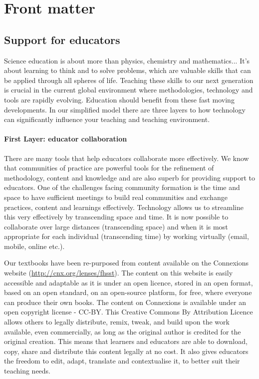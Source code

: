 \chapter{Front matter}

\section{Support for educators}
Science education is about more than physics, chemistry and mathematics... It's about learning to think and to solve problems, which are valuable skills that can be applied through all spheres of life. Teaching these skills to our next generation is crucial in the current global environment where methodologies, technology and tools are rapidly evolving. Education should benefit from these fast moving developments. In our simplified model there are three layers to how technology can significantly influence your teaching and teaching environment. 

\subsubsection{First Layer: educator collaboration}
There are many tools that help educators collaborate more effectively. We know that communities of practice are powerful tools for the refinement of methodology, content and knowledge and are also superb for providing support to educators. One of the challenges facing community formation is the time and space to have sufficient meetings to build real communities and exchange practices, content and learnings effectively. Technology allows us to streamline this very effectively by transcending space and time. It is now possible to collaborate over large distances (transcending space) and when it is most appropriate for each individual (transcending time) by working virtually (email, mobile, online etc.).\par

Our textbooks have been re-purposed from content available on the Connexions website (\url{http://cnx.org/lenses/fhsst}). The content on this website is easily accessible and adaptable  as it is under an open licence, stored in an open format, based on an open standard, on an open-source platform, for free, where everyone can produce their own books. The content on Connexions is available under an open copyright license - CC-BY. This Creative Commons By Attribution Licence allows others to legally distribute, remix, tweak, and build upon the work available, even commercially, as long as the original author is credited for the original creation. This means that learners and educators are able to download, copy, share and distribute this content legally at no cost. It also gives educators the freedom to edit, adapt, translate and contextualise it, to better suit their teaching needs. \par

